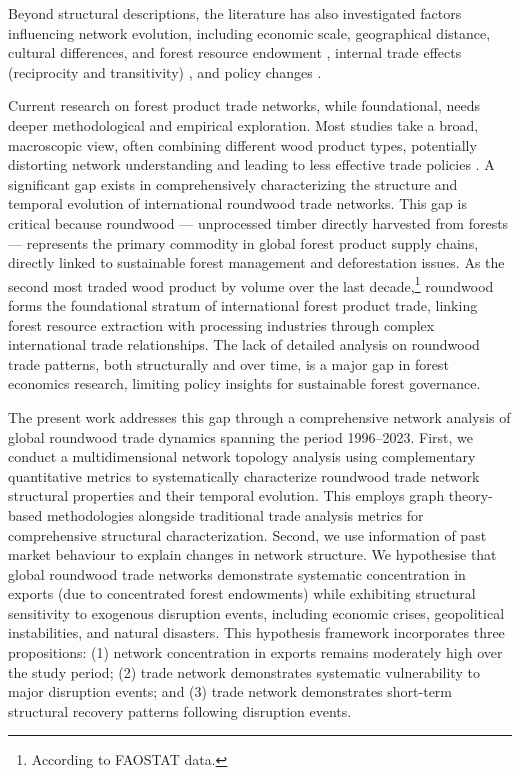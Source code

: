 \documentclass[
  authoryear,
  review,
  3p]{elsarticle}
\begin{document}
Beyond structural descriptions, the literature has also investigated
factors influencing network evolution, including economic scale,
geographical distance, cultural differences, and forest resource
endowment \citep{gao_trade_2024}, internal trade effects (reciprocity
and transitivity) \citep{shen_structural_2022}, and policy changes
\citep{huang_static_2024}.

Current research on forest product trade networks, while foundational,
needs deeper methodological and empirical exploration. Most studies take
a broad, macroscopic view, often combining different wood product types,
potentially distorting network understanding and leading to less
effective trade policies \citep{gao_trade_2024, liu_analysis_2024}. A
significant gap exists in comprehensively characterizing the structure
and temporal evolution of international roundwood trade networks. This
gap is critical because roundwood --- unprocessed timber directly
harvested from forests --- represents the primary commodity in global
forest product supply chains, directly linked to sustainable forest
management and deforestation issues. As the second most traded wood
product by volume over the last decade,\footnote{According to FAOSTAT
  data.} roundwood forms the foundational stratum of international
forest product trade, linking forest resource extraction with processing
industries through complex international trade relationships. The lack
of detailed analysis on roundwood trade patterns, both structurally and
over time, is a major gap in forest economics research, limiting policy
insights for sustainable forest governance.

The present work addresses this gap through a comprehensive network
analysis of global roundwood trade dynamics spanning the period
1996--2023. First, we conduct a multidimensional network topology
analysis using complementary quantitative metrics to systematically
characterize roundwood trade network structural properties and their
temporal evolution. This employs graph theory-based methodologies
alongside traditional trade analysis metrics for comprehensive
structural characterization. Second, we use information of past market
behaviour to explain changes in network structure. We hypothesise that
global roundwood trade networks demonstrate systematic concentration in
exports (due to concentrated forest endowments) while exhibiting
structural sensitivity to exogenous disruption events, including
economic crises, geopolitical instabilities, and natural disasters. This
hypothesis framework incorporates three propositions: (1) network
concentration in exports remains moderately high over the study period;
(2) trade network demonstrates systematic vulnerability to major
disruption events; and (3) trade network demonstrates short-term
structural recovery patterns following disruption events.
\end{document}
